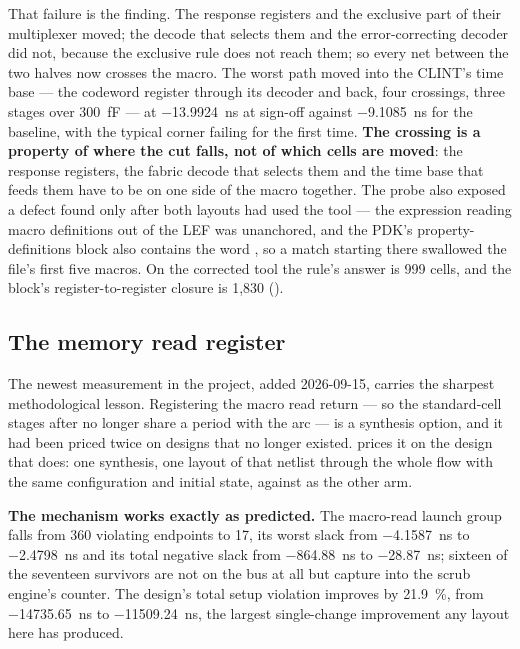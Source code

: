 That failure is the finding. The response registers and the exclusive
part of their multiplexer moved; the decode that selects them and the
 error-correcting decoder did not, because the exclusive
rule does not reach them; so every net between the two halves now
crosses the macro. The worst path moved into the CLINT's time base ---
the codeword register through its decoder and back, four crossings,
three stages over \qty{300}{\femto\farad} --- at
\qty{-13.9924}{\nano\second} at sign-off against
\qty{-9.1085}{\nano\second} for the baseline, with the typical corner
failing for the first time. \textbf{The crossing is a property of where
the cut falls, not of which cells are moved}: the response registers,
the fabric decode that selects them and the time base that feeds them
have to be on one side of the macro together. The probe also exposed a
defect found only after both layouts had used the tool --- the
expression reading macro definitions out of the LEF was unanchored, and
the PDK's property-definitions block also contains the word
, so a match starting there swallowed the file's first five
macros. On the corrected tool the rule's answer is 999 cells, and the
block's register-to-register closure is 1,830
().

\subsection{The memory read register}
\label{sec:phys-rdreg}

The newest measurement in the project, added 2026-09-15, carries the
sharpest methodological lesson. Registering the macro read return ---
so the standard-cell stages after  no longer share a
period with the arc --- is a synthesis option, and it had been priced
twice on designs that no longer existed.  prices
it on the design that does: one synthesis, one layout of that netlist
through the whole flow with the same configuration and initial state,
against  as the other arm.

\textbf{The mechanism works exactly as predicted.} The macro-read launch
group falls from 360 violating endpoints to 17, its worst slack from
\qty{-4.1587}{\nano\second} to \qty{-2.4798}{\nano\second} and its total
negative slack from \qty{-864.88}{\nano\second} to
\qty{-28.87}{\nano\second}; sixteen of the seventeen survivors are not
on the bus at all but capture into the scrub engine's counter. The
design's total setup violation improves by \qty{21.9}{\percent}, from
\qty{-14735.65}{\nano\second} to \qty{-11509.24}{\nano\second}, the
largest single-change improvement any layout here has produced.

